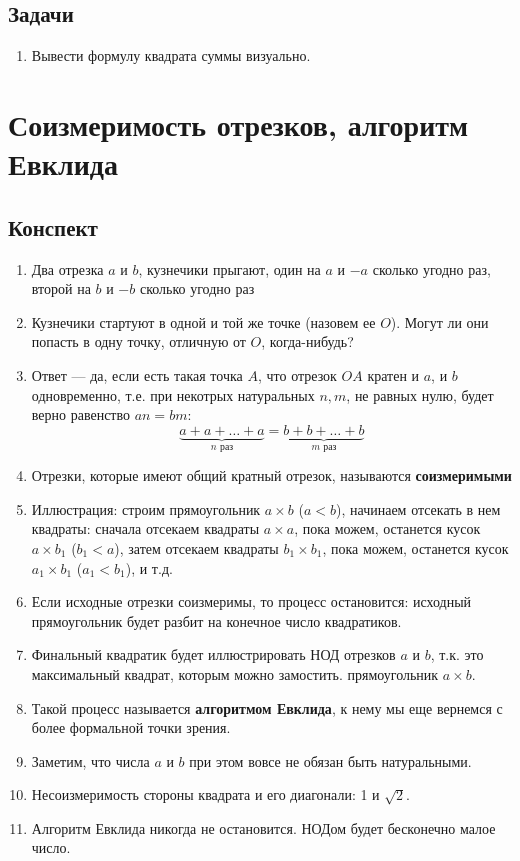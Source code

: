 \subsection{Задачи}
\begin{enumerate}
\item Вывести формулу квадрата суммы визуально.
\end{enumerate}


\section{Соизмеримость отрезков, алгоритм Евклида}

\subsection{Конспект}
\begin{enumerate}\setlength{\itemsep}{1pt}
\item Два отрезка $a$ и $b$, кузнечики прыгают, один на $a$ и $-a$ сколько угодно раз, второй на $b$ и $-b$ сколько угодно раз
\item Кузнечики стартуют в одной и той же точке (назовем ее $O$). Могут ли они попасть в одну точку, отличную от $O$, когда-нибудь?
\item Ответ --- да, если есть такая точка $A$, что отрезок $OA$ кратен и $a$, и $b$ одновременно, т.е. при некотрых натуральных $n,m$, не равных нулю, будет верно равенство $an=bm$:
$$
\underbrace{a+a+\dots+a}_{n\mbox{ раз}}=\underbrace{b+b+\dots+b}_{m\mbox{ раз}}
$$
\item Отрезки, которые имеют общий кратный отрезок, называются \textbf{соизмеримыми}
\item Иллюстрация: строим прямоугольник $a\times b$ ($a<b$), начинаем отсекать в нем квадраты: сначала отсекаем квадраты $a\times a$, пока можем, останется кусок $a\times b_1$ ($b_1<a$), затем отсекаем квадраты $b_1\times b_1$, пока можем, останется кусок $a_1\times b_1$ ($a_1<b_1$), и т.д.
\item Если исходные отрезки соизмеримы, то процесс остановится: исходный прямоугольник будет разбит на конечное число квадратиков.
\item Финальный квадратик будет иллюстрировать НОД отрезков $a$ и $b$, т.к. это максимальный квадрат, которым можно замостить. прямоугольник $a\times b$.
\item Такой процесс называется \textbf{алгоритмом Евклида}, к нему мы еще вернемся с более формальной точки зрения.
\item Заметим, что числа $a$ и $b$ при этом вовсе не обязан быть натуральными.
\item Несоизмеримость стороны квадрата и его диагонали: 1 и $\sqrt 2$.
\item Алгоритм Евклида никогда не остановится. НОДом будет бесконечно малое число.
\end{enumerate}
